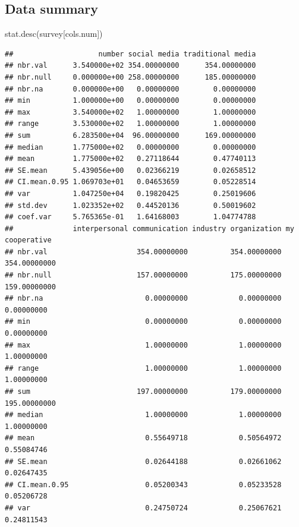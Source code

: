 \documentclass[
]{article}
\newenvironment{Shaded}{\begin{snugshade}}{\end{snugshade}}
\newcommand{\FunctionTok}[1]{\textcolor[rgb]{0.00,0.00,0.00}{#1}}
\newcommand{\NormalTok}[1]{#1}
\begin{document}
\hypertarget{data-summary}{%
\subsection{Data summary}\label{data-summary}}

\begin{Shaded}
\begin{Highlighting}[]
\FunctionTok{stat.desc}\NormalTok{(survey[cols.num])}
\end{Highlighting}
\end{Shaded}

\begin{verbatim}
##                    number social media traditional media
## nbr.val      3.540000e+02 354.00000000      354.00000000
## nbr.null     0.000000e+00 258.00000000      185.00000000
## nbr.na       0.000000e+00   0.00000000        0.00000000
## min          1.000000e+00   0.00000000        0.00000000
## max          3.540000e+02   1.00000000        1.00000000
## range        3.530000e+02   1.00000000        1.00000000
## sum          6.283500e+04  96.00000000      169.00000000
## median       1.775000e+02   0.00000000        0.00000000
## mean         1.775000e+02   0.27118644        0.47740113
## SE.mean      5.439056e+00   0.02366219        0.02658512
## CI.mean.0.95 1.069703e+01   0.04653659        0.05228514
## var          1.047250e+04   0.19820425        0.25019606
## std.dev      1.023352e+02   0.44520136        0.50019602
## coef.var     5.765365e-01   1.64168003        1.04774788
##              interpersonal communication industry organization my cooperative
## nbr.val                     354.00000000          354.00000000   354.00000000
## nbr.null                    157.00000000          175.00000000   159.00000000
## nbr.na                        0.00000000            0.00000000     0.00000000
## min                           0.00000000            0.00000000     0.00000000
## max                           1.00000000            1.00000000     1.00000000
## range                         1.00000000            1.00000000     1.00000000
## sum                         197.00000000          179.00000000   195.00000000
## median                        1.00000000            1.00000000     1.00000000
## mean                          0.55649718            0.50564972     0.55084746
## SE.mean                       0.02644188            0.02661062     0.02647435
## CI.mean.0.95                  0.05200343            0.05233528     0.05206728
## var                           0.24750724            0.25067621     0.24811543

\end{verbatim}
\end{document}
